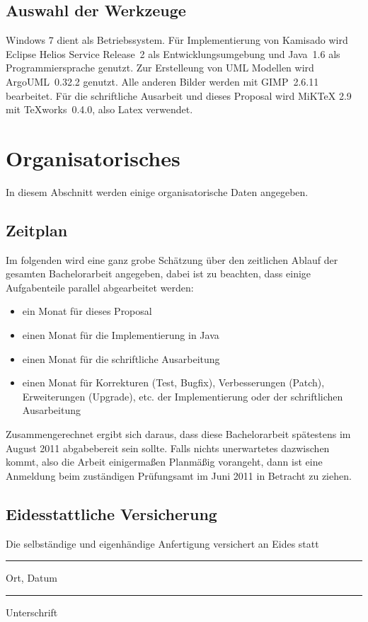 \documentclass[
	12pt,
	halfparskip,
	a4paper,
	abstract,
	bibliography=totoc,
	liststotoc
]{scrreprt}
\begin{document}
\section{Auswahl der Werkzeuge}

Windows 7 dient als Betriebssystem. Für Implementierung von Kamisado wird Eclipse Helios Service Release~2 als Entwicklungsumgebung und Java~1.6 als Programmiersprache genutzt. Zur Erstelleung von UML Modellen wird ArgoUML~0.32.2 genutzt. Alle anderen Bilder werden mit GIMP~2.6.11 bearbeitet. Für die schriftliche Ausarbeit und dieses Proposal wird MiKTeX 2.9 mit TeXworks~0.4.0, also Latex verwendet.

\chapter{Organisatorisches}

In diesem Abschnitt werden einige organisatorische Daten angegeben.

\section{Zeitplan}

Im folgenden wird eine ganz grobe Schätzung über den zeitlichen Ablauf der gesamten Bachelorarbeit angegeben, dabei ist zu beachten, dass einige Aufgabenteile parallel abgearbeitet werden:

\begin{itemize} 
\item ein Monat für dieses Proposal
\item einen Monat für die Implementierung in Java
\item einen Monat für die schriftliche Ausarbeitung
\item einen Monat für Korrekturen (Test, Bugfix), Verbesserungen (Patch), Erweiterungen (Upgrade), etc. der Implementierung oder der schriftlichen Ausarbeitung
\end{itemize}

Zusammengerechnet ergibt sich daraus, dass diese Bachelorarbeit spätestens im August 2011 abgabebereit sein sollte. Falls nichts unerwartetes dazwischen kommt, also die Arbeit einigermaßen Planmäßig vorangeht, dann ist eine Anmeldung beim zuständigen Prüfungsamt im Juni 2011 in Betracht zu ziehen.

\section{Eidesstattliche Versicherung}

Die selbständige und eigenhändige Anfertigung versichert an Eides statt

\vskip 3cm

\parbox{0.4\textwidth}{
	\hrule
	\strut
	\centering
	\footnotesize Ort, Datum}
\hfill
\parbox{0.4\textwidth}{
	\hrule
	\strut
	\centering
	\footnotesize Unterschrift}



\end{document}
